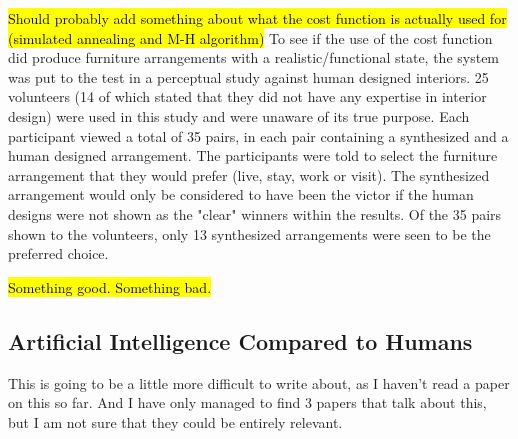 \hl{Should probably add something about what the cost function is actually used for (simulated annealing and M-H algorithm)}
To see if the use of the cost function did produce furniture arrangements with a realistic/functional state, the system was put to the test in a perceptual study against human designed interiors. 25 volunteers (14 of which stated that they did not have any expertise in interior design) were used in this study and were unaware of its true purpose. Each participant viewed a total of 35 pairs, in each pair containing a synthesized and a human designed arrangement. The participants were told to select the furniture arrangement that they would prefer (live, stay, work or visit). The synthesized arrangement would only be considered to have been the victor if the human designs were not shown as the "clear" winners within the results. Of the 35 pairs shown to the volunteers, only 13 synthesized arrangements were seen to be the preferred choice.

\hl{Something good. Something bad.}

\subsection{Artificial Intelligence Compared to Humans}
This is going to be a little more difficult to write about, as I haven't read a paper on this so far. And I have only managed to find 3 papers that talk about this, but I am not sure that they could be entirely relevant.